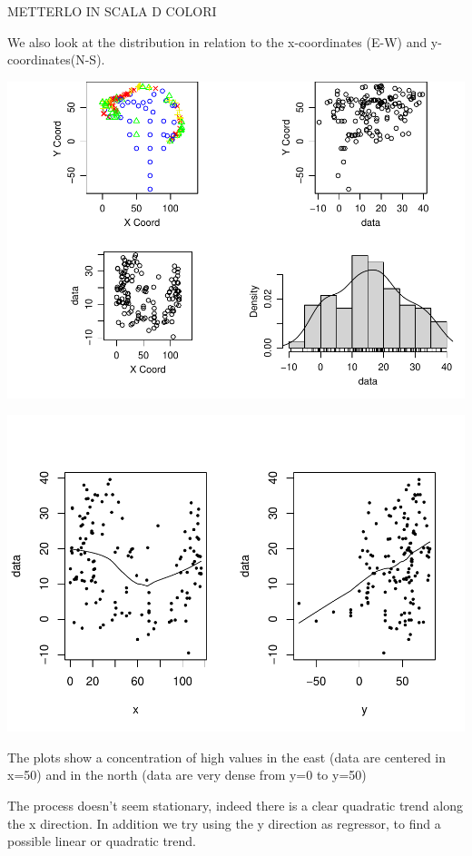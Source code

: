 \documentclass[
]{article}
\begin{document}
METTERLO IN SCALA D COLORI

We also look at the distribution in relation to the x-coordinates (E-W)
and y-coordinates(N-S).

\includegraphics{Assignment_1_files/figure-latex/unnamed-chunk-6-1.pdf}

\includegraphics{Assignment_1_files/figure-latex/unnamed-chunk-7-1.pdf}

The plots show a concentration of high values in the east (data are
centered in x=50) and in the north (data are very dense from y=0 to
y=50)

The process doesn't seem stationary, indeed there is a clear quadratic
trend along the x direction. In addition we try using the y direction as
regressor, to find a possible linear or quadratic trend.
\end{document}
